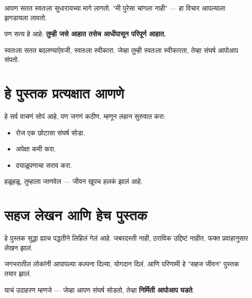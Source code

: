आपण सतत स्वतःला सुधारायच्या मागे लागतो.  
"मी पुरेसा चांगला नाही" — हा विचार आपल्याला झगडायला लावतो.  

पण सत्य हे आहे:  
\textbf{तुम्ही जसे आहात तसेच आधीपासून परिपूर्ण आहात.}  

स्वतःला सतत बदलण्याऐवजी, स्वतःला स्वीकारा.  
जेव्हा तुम्ही स्वतःला स्वीकारता,  
तेव्हा संघर्ष आपोआप संपतो.  



\section*{हे पुस्तक प्रत्यक्षात आणणे}

हे सर्व वाचणं सोपं आहे, पण जगणं कठीण.  
म्हणून लहान सुरुवात करा:  
\begin{itemize}
  \item रोज एक छोटासा संघर्ष सोडा.  
  \item अपेक्षा कमी करा.  
  \item दयाळूपणाचा सराव करा.  
\end{itemize}

हळूहळू, तुम्हाला जाणवेल —  
जीवन खूपच हलकं झालं आहे.  



\section*{सहज लेखन आणि हेच पुस्तक}

हे पुस्तक सुद्धा ह्याच पद्धतीने लिहिलं गेलं आहे.  
जबरदस्ती नाही, ठराविक उद्दिष्टं नाहीत,  
फक्त प्रवाहानुसार लेखन झालं.  

जगभरातील लोकांनी आपापल्या कल्पना दिल्या, योगदान दिलं.  
आणि परिणामी हे "सहज जीवन" पुस्तक तयार झालं.  

याचं उदाहरण म्हणजे —  
जेव्हा आपण संघर्ष सोडतो, तेव्हा \textbf{निर्मिती आपोआप घडते}.  
